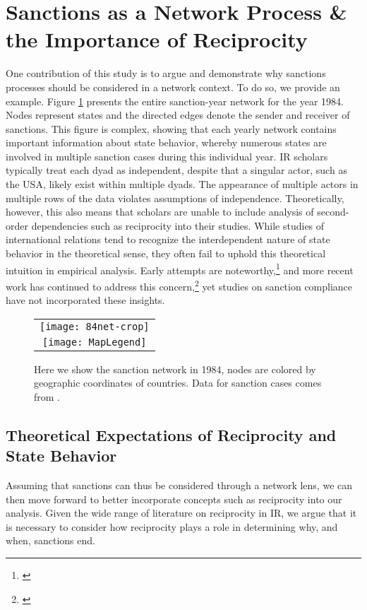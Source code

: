 \section*{Sanctions as a Network Process \& the Importance of Reciprocity}
\label{neteffects}

One contribution of this study is to argue and demonstrate why sanctions processes should be considered in a network context. To do so, we provide an example. Figure \ref{fig:spaghetti} presents the entire sanction-year network for the year 1984.  Nodes represent states and the directed edges denote the sender and receiver of sanctions. This figure is complex, showing that each yearly network contains important information about state behavior, whereby numerous states are involved in multiple sanction cases during this individual year.  IR scholars typically treat each dyad as independent, despite that a singular actor, such as the USA, likely exist within multiple dyads. The appearance of multiple actors in multiple rows of the data violates assumptions of independence. Theoretically, however, this also means that scholars are unable to include analysis of second-order dependencies such as reciprocity into their studies. While studies of international relations tend to recognize the interdependent nature of state behavior in the theoretical sense, they often fail to uphold this theoretical intuition in empirical analysis. Early attempts are noteworthy,\footnote{\cite{keohane1989reciprocity,goldstein1991reciprocity}} and more recent work has continued to address this concern,\footnote{\cite{mitchell2001,cranmer2014reciprocity}} yet studies on sanction compliance have not incorporated these insights. 

\begin{figure}[ht]
  \centering
  \begin{tabular}{c}
	  \texttt{[image: 84net-crop]} \\
	  \texttt{[image: MapLegend]}
  \end{tabular}
  \caption{Here we show the sanction network in 1984, nodes are colored by geographic coordinates of countries. Data for sanction cases comes from \citet{morgan2009threat}.}
  \label{fig:spaghetti}
\end{figure}
\FloatBarrier




\subsection*{Theoretical Expectations of Reciprocity and State Behavior}
Assuming that sanctions can thus be considered through a network lens, we can then move forward to better incorporate concepts such as reciprocity into our analysis. Given the wide range of literature on reciprocity in IR, we argue that it is necessary to consider how reciprocity plays a role in determining why, and when, sanctions end.

